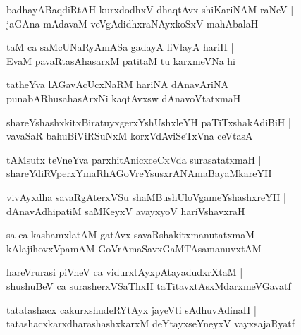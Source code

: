 \documentclass[twoside,12pt,openright]{book}
\newcounter{shloka}[chapter]
\begin{document}
\begin{shloka}%
badhayABaqdiRtAH kurxdodhxV dhaqtAvx shiKariNAM raNeV |\\
jaGAna mAdavaM veVgAdidhxraNAyxkoSxV mahAbalaH 
\end{shloka}

\begin{shloka}%
taM ca saMcUNaRyAmASa gadayA liVlayA hariH |\\
EvaM pavaRtasAhasarxM patitaM tu karxmeVNa hi 
\end{shloka}

\begin{shloka}%
tatheYva lAGavAcUcxNaRM  hariNA dAnavAriNA |\\
punabARhusahasArxNi kaqtAvxsw dAnavoVtatxmaH 
\end{shloka}

\begin{shloka}%
shareYshashxkitxBiratuyxgerxYshUshxleYH paTiTxshakAdiBiH |\\
vavaSaR bahuBiViRSuNxM korxVdAviSeTxVna ceVtasA 
\end{shloka}

\begin{shloka}%
tAMsutx teVneYva parxhitAnicxceCxVda surasatatxmaH |\\
shareYdiRVperxYmaRhAGoVreYsusxrANAmaBayaMkareYH 
\end{shloka}

\begin{shloka}%
vivAyxdha savaRgAterxVSu shaMBushUloVgameYshashxreYH |\\
dAnavAdhipatiM saMKeyxV avayxyoV hariVshavxraH
\end{shloka}

\begin{shloka}%
sa ca kashamxlatAM gatAvx savaRshakitxmanutatxmaM |\\
kAlajihovxVpamAM GoVrAmaSavxGaMTAsamanuvxtAM
\end{shloka}

\begin{shloka}%
hareVrurasi piVneV ca vidurxtAyxpAtayadudxrXtaM |\\
shushuBeV ca surasherxVSaThxH taTitavxtAsxMdarxmeVGavatf 
\end{shloka}

\begin{shloka}%
tatatashacx cakurxshudeRYtAyx jayeVti sAdhuvAdinaH |\\
tatashacxkarxdharashashxkarxM deYtayxseYneyxV vayxsajaRyatf
\end{shloka}
\end{document}
